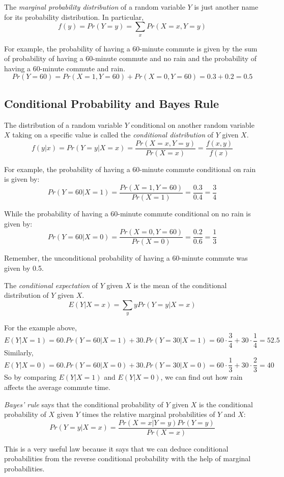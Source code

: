 \documentclass{./../../Latex/handout}
\begin{document}
The \textit{marginal probability distribution} of a random variable $Y$ is just another name for its probability distribution. In particular, 
$$ f(y) = Pr(Y=y) = \sum_{x} Pr(X=x, Y=y) $$

For example, the probability of having a 60-minute commute is given by the sum of probability of having a 60-minute commute and no rain and the probability of having a 60-minute commute and rain. 
$$ Pr(Y=60) = Pr(X=1, Y=60) + Pr(X=0, Y=60) = 0.3 + 0.2 = 0.5 $$


\subsection{Conditional Probability and Bayes Rule}
The distribution of a random variable $Y$ conditional on another random variable $X$ taking on a specific value is called the \textit{conditional
distribution} of $Y$ given $X$.
$$ f(y|x) = Pr(Y=y| X=x) = \frac{Pr(X=x, Y=y)}{Pr(X=x)} = \frac{f(x,y)}{f(x)}  $$

For example, the probability of having a 60-minute commute conditional on rain is given by:
$$ Pr(Y=60| X=1) = \frac{Pr(X=1, Y=60)}{Pr(X=1)}  = \frac{0.3}{0.4} = \frac{3}{4} $$

While the probability of having a 60-minute commute conditional on no rain is given by:
$$ Pr(Y=60| X=0) = \frac{Pr(X=0, Y=60)}{Pr(X=0)}  = \frac{0.2}{0.6} =\frac{1}{3} $$

Remember, the unconditional probability of having a 60-minute commute was given by 0.5.

The \textit{conditional expectation} of $Y$ given $X$ is the mean of the conditional distribution of $Y$ given $X$. \\
$$ E(Y|X=x) = \sum_{y} y Pr(Y=y | X=x) $$

For the example above, 
$$ E(Y|X=1) = 60.Pr(Y=60 | X=1) + 30.Pr(Y=30 | X=1) = 60 \cdot \frac{3}{4} + 30 \cdot \frac{1}{4}  = 52.5 $$
Similarly,
$$ E(Y|X=0) = 60.Pr(Y=60 | X=0) + 30.Pr(Y=30 | X=0) = 60 \cdot \frac{1}{3} + 30 \cdot \frac{2}{3}  = 40 $$
So by comparing $E(Y|X=1)$ and $E(Y|X=0)$, we can find out how rain affects the average commute time. 

\textit{Bayes' rule} says that the conditional probability of $Y$ given $X$ is the conditional probability of $X$ given $Y$ times the relative marginal probabilities of $Y$ and $X$:
$$ Pr(Y=y| X=x) = \frac{Pr(X=x| Y=y)Pr(Y=y)}{Pr(X=x)}   $$

This is a very useful law because it says that we can deduce conditional probabilities from the reverse conditional probability with the help of marginal probabilities. 
\end{document}
